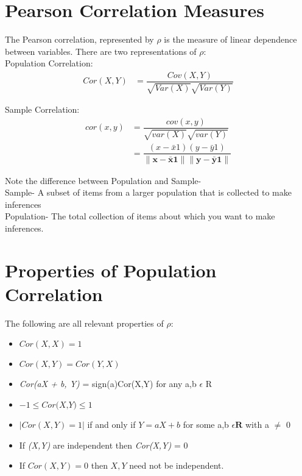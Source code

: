 \documentclass[11pt]{article}
\begin{document}
\section{Pearson Correlation Measures}

The Pearson correlation, represented by \(\rho\) is the measure of linear dependence between variables.
There are two representations of \(\rho\): \\

Population Correlation:
\begin{align}
Cor(X,Y)
&= \dfrac{Cov(X,Y)}{\sqrt{Var(X)}\sqrt{Var(Y)}}
\end{align}

Sample Correlation:
\begin{align}
cor(x,y)
&= \dfrac{cov(x,y)}{\sqrt{var(X)}\sqrt{var(Y)}} \\
&= \dfrac{(x - \bar{x}1)(y - \bar{y}1)}{\| \mathbf{x - \bar{x}1} \|\| \mathbf{y - \bar{y}1} \|}
\end{align}

Note the difference between Population and Sample- \\
Sample- A subset of items from a larger population that is collected to make inferences \\
Population- The total collection of items about which you want to make inferences.



\section{Properties of Population Correlation}
The following are all relevant properties of \(\rho\):

\begin{itemize}
\item $Cor(X,X) = 1$
\item $Cor(X,Y) = Cor(Y,X)$
\item \textit{Cor(aX + b, Y)} = sign(a)Cor(X,Y) for any a,b $\epsilon$ R
\item $-1 \leq \textit{Cor(X,Y)}  \leq 1 $
\item $|Cor(X,Y)  =  1|$ if and only if $Y = aX + b$ for some a,b $\epsilon \mathbf{R}$ with a $\neq$ 0 
\item If  \textit{(X,Y)} are independent then \textit{Cor(X,Y)} = 0
\item If $Cor(X,Y) = 0$ then $X,Y$ need not be independent.


\end{itemize}
\end{document}
